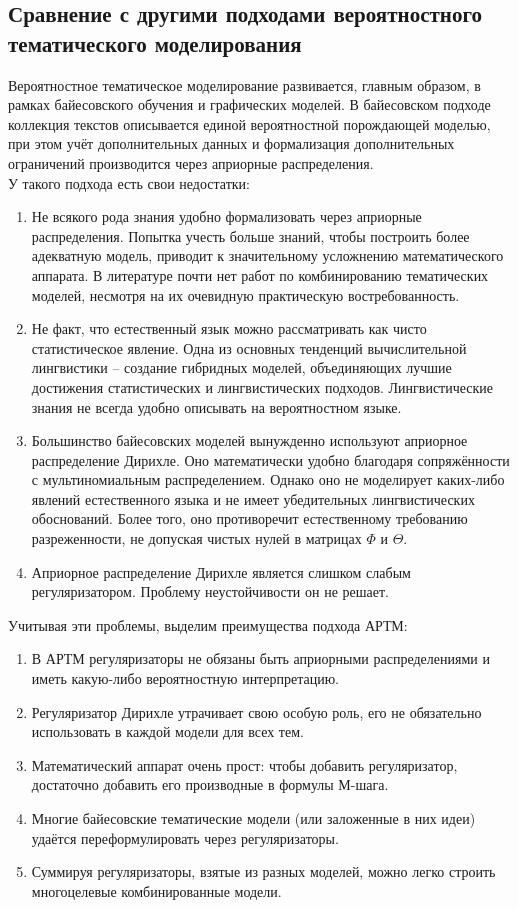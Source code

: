 \documentclass[12pt]{article}
\begin{document}
\subsection{Сравнение с другими подходами вероятностного тематического моделирования}
Вероятностное тематическое моделирование развивается, главным образом, в рамках байесовского обучения и графических моделей. В байесовском подходе коллекция текстов описывается единой вероятностной порождающей моделью, при этом учёт дополнительных данных и формализация дополнительных ограничений производится через априорные распределения.\\
У такого подхода есть свои недостатки:
\begin{enumerate}
\item Не всякого рода знания удобно формализовать через априорные распределения. Попытка учесть больше знаний, чтобы построить более адекватную модель, приводит к значительному усложнению математического аппарата. В литературе почти нет работ по комбинированию тематических моделей, несмотря на их очевидную практическую востребованность.
\item Не факт, что естественный язык можно рассматривать как чисто статистическое явление. Одна из основных тенденций вычислительной лингвистики -- создание гибридных моделей, объединяющих лучшие достижения статистических и лингвистических подходов. Лингвистические знания не всегда удобно описывать на вероятностном языке.
\item Большинство байесовских моделей вынужденно используют априорное распределение Дирихле\cite{ldadef1}. Оно математически удобно благодаря сопряжённости с мультиномиальным распределением. Однако оно не моделирует каких-либо явлений естественного языка и не имеет убедительных лингвистических обоснований. Более того, оно противоречит естественному требованию разреженности, не допуская чистых нулей в матрицах $\Phi$  и $\Theta$.
\item Априорное распределение Дирихле является слишком слабым регуляризатором. Проблему неустойчивости он не решает.
\end{enumerate}
Учитывая эти проблемы, выделим преимущества подхода АРТМ:
\begin{enumerate}
\item В АРТМ регуляризаторы не обязаны быть априорными распределениями и иметь какую-либо вероятностную интерпретацию.
\item Регуляризатор Дирихле утрачивает свою особую роль, его не обязательно использовать в каждой модели для всех тем.
\item Математический аппарат очень прост: чтобы добавить регуляризатор, достаточно добавить его производные в формулы М-шага.
\item Многие байесовские тематические модели (или заложенные в них идеи) удаётся переформулировать через регуляризаторы.
\item Суммируя регуляризаторы, взятые из разных моделей, можно легко строить многоцелевые комбинированные модели.
\end{enumerate}
\end{document}
